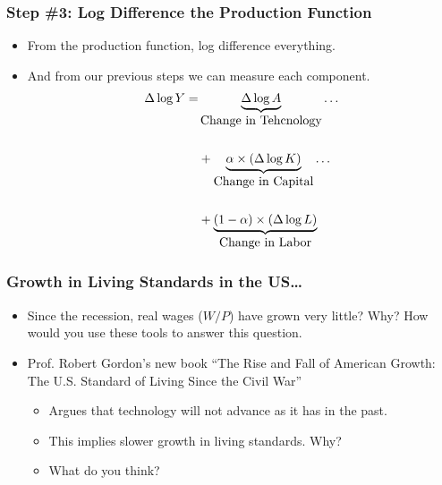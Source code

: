 \documentclass[handout]{beamer}
\begin{document}
\begin{frame}[t]
\frametitle{Step \#3: Log Difference the Production Function}
\begin{itemize}
\item From the production function, log difference everything.
\medskip
\item And from our previous steps we can measure each component.
\begin{eqnarray*}
\Delta \log Y = & \underbrace{\Delta \log A}_{\mbox{Change in Tehcnology}} \dots \\
\\
& +  \underbrace{\alpha \times (\Delta \log K)}_{\mbox{Change in Capital}} \dots \\
\\
\vspace{1cm}
& + \underbrace{(1-\alpha)\times(\Delta \log L)}_{\mbox{Change in Labor}}
\end{eqnarray*}
\end{itemize}
\end{frame}


\begin{frame}[t]
\frametitle{Growth in Living Standards in the US\ldots}
\begin{itemize}
\item Since the recession, real wages ($W/P$) have grown very little? Why? How would you use these tools to answer this question.
\bigskip
\item Prof. Robert Gordon's new book ``The Rise and Fall of American Growth: The U.S. Standard of Living Since the Civil War''
\begin{itemize}
\medskip
\item Argues that technology will not advance as it has in the past.
\medskip
\item This implies slower growth in living standards. Why?
\medskip
\item What do you think?
\end{itemize}
\end{itemize}
\end{frame}

\end{document}
